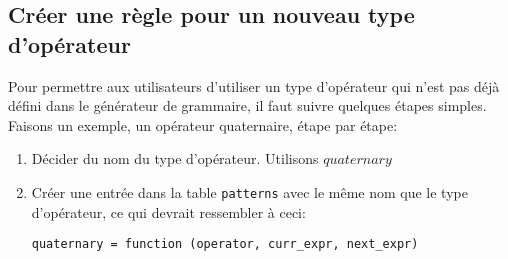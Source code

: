 \documentclass{article}
\begin{document}
\subsection{Créer une règle pour un nouveau type d'opérateur}
Pour permettre aux utilisateurs d'utiliser un type d'opérateur qui n'est pas déjà défini dans le générateur de grammaire, il faut suivre quelques étapes simples. Faisons un exemple, un opérateur quaternaire, étape par étape:
\begin{enumerate}
	\item Décider du nom du type d'opérateur. Utilisons $quaternary$
	\item Créer une entrée dans la table \lstinline|patterns| avec le même nom que le type d'opérateur, ce qui devrait ressembler à ceci:
	\begin{verbatim}
quaternary = function (operator, curr_expr, next_expr)


\end{verbatim}
\end{enumerate}
\end{document}
